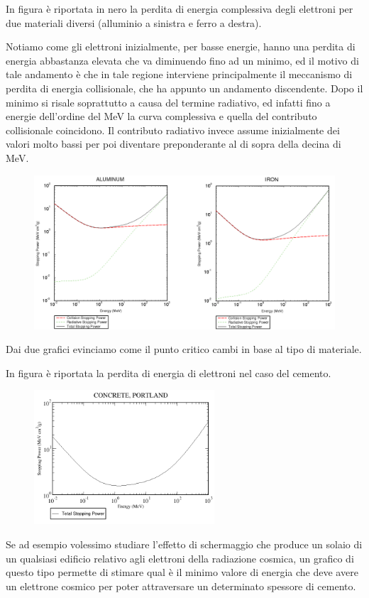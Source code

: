 \begin{esempio}
    In figura è riportata in nero la perdita di energia complessiva degli elettroni per due materiali diversi (alluminio a sinistra e ferro a destra).
    
    Notiamo come gli elettroni inizialmente, per basse energie, hanno una perdita di energia abbastanza elevata che va diminuendo fino ad un minimo, ed il motivo di tale andamento è che in tale regione interviene principalmente il meccanismo di perdita di energia collisionale, che ha appunto un andamento discendente. Dopo il minimo si risale soprattutto a causa del termine radiativo, ed infatti fino a energie dell'ordine del MeV la curva complessiva e quella del contributo collisionale coincidono. Il contributo radiativo invece assume inizialmente dei valori molto bassi per poi diventare preponderante al di sopra della decina di MeV.
    \begin{figure}[H]
        \centering
        \includegraphics[width=\textwidth]{immagini/esempi_energy_loss_elettroni.png}
    \end{figure}
    Dai due grafici evinciamo come il punto critico cambi in base al tipo di materiale.
\end{esempio}

\begin{esempio}
    In figura è riportata la perdita di energia di elettroni nel caso del cemento.
    \begin{figure}[H]
        \centering
        \includegraphics[width=0.6\textwidth]{immagini/energy_loss_elettroni_cemento.png}
    \end{figure}
    Se ad esempio volessimo studiare l'effetto di schermaggio che produce un solaio di un qualsiasi edificio relativo agli elettroni della radiazione cosmica, un grafico di questo tipo permette di stimare qual è il minimo valore di energia che deve avere un elettrone cosmico per poter attraversare un determinato spessore di cemento.
\end{esempio}

